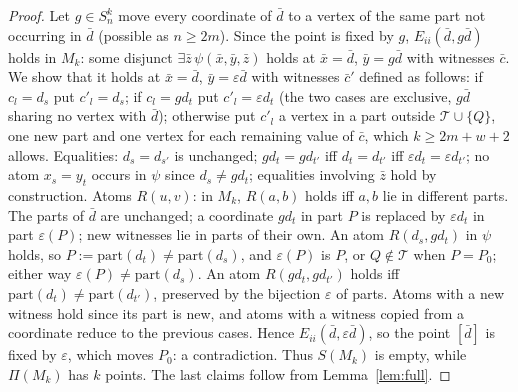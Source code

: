 \documentclass[11pt]{amsart}
\theoremstyle{definition}
\begin{document}
\begin{proof}
Let $g\in S_n^k$ move every coordinate of $\bar d$ to a vertex of the same
part not occurring in $\bar d$ (possible as $n\ge2m$). Since the point is
fixed by $g$, $E_{ii}(\bar d,g\bar d)$ holds in $M_k$: some disjunct
$\exists\bar z\,\psi(\bar x,\bar y,\bar z)$ holds at $\bar x=\bar d$,
$\bar y=g\bar d$ with witnesses $\bar c$. We show that it holds at
$\bar x=\bar d$, $\bar y=\varepsilon\bar d$ with witnesses $\bar c'$
defined as follows: if $c_l=d_s$ put $c'_l=d_s$; if $c_l=g d_t$ put
$c'_l=\varepsilon d_t$ (the two cases are exclusive, $g\bar d$ sharing no
vertex with $\bar d$); otherwise put $c'_l$ a vertex in a part outside
$\mathcal T\cup\{Q\}$, one new part and one vertex for each remaining
value of $\bar c$, which $k\ge2m+w+2$ allows. Equalities: $d_s=d_{s'}$
is unchanged; $gd_t=gd_{t'}$ iff $d_t=d_{t'}$ iff $\varepsilon d_t=
\varepsilon d_{t'}$; no atom $x_s=y_t$ occurs in $\psi$ since $d_s\ne
gd_t$; equalities involving $\bar z$ hold by construction. Atoms
$R(u,v)$: in $M_k$, $R(a,b)$ holds iff $a,b$ lie in different parts.
The parts of $\bar d$ are unchanged; a coordinate $gd_t$ in part $P$ is
replaced by $\varepsilon d_t$ in part $\varepsilon(P)$; new witnesses lie
in parts of their own. An atom $R(d_s,gd_t)$ in $\psi$ holds, so $P:=
\mathrm{part}(d_t)\ne\mathrm{part}(d_s)$, and $\varepsilon(P)$ is $P$,
or $Q\notin\mathcal T$ when $P=P_0$; either way $\varepsilon(P)\ne
\mathrm{part}(d_s)$. An atom $R(gd_t,gd_{t'})$ holds iff
$\mathrm{part}(d_t)\ne\mathrm{part}(d_{t'})$, preserved by the bijection
$\varepsilon$ of parts. Atoms with a new witness hold since its part is
new, and atoms with a witness copied from a coordinate reduce to the
previous cases. Hence $E_{ii}(\bar d,\varepsilon\bar d)$, so the point
$[\bar d]$ is fixed by $\varepsilon$, which moves $P_0$: a
contradiction. Thus $S(M_k)$ is empty, while $\Pi(M_k)$ has $k$
points. The last claims follow from Lemma~\ref{lem:full}.
\end{proof}
\end{document}
